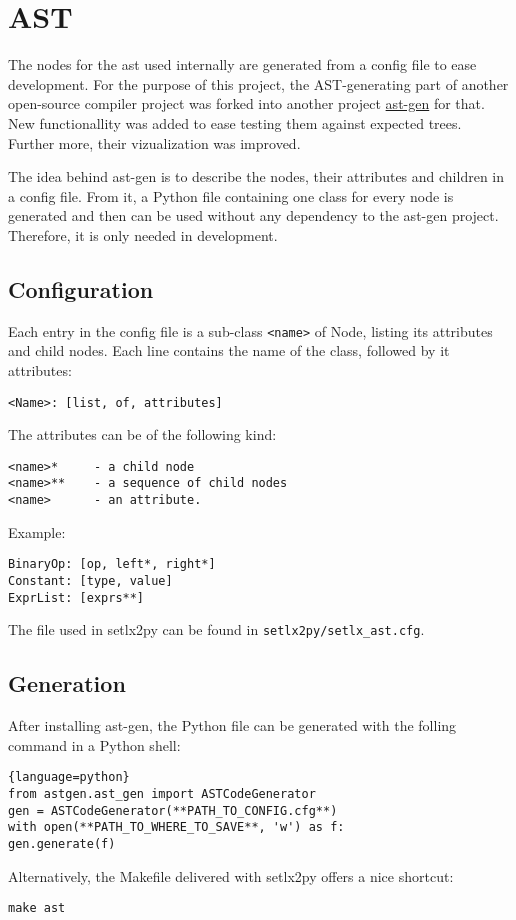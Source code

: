 
\section{AST}
\label{sec:ast}


The nodes for the \gls{ast} used  internally are generated from a config file to ease development. For the purpose of this project, the AST-generating part of another open-source compiler project  was forked into another project \url{ast-gen} for that. New functionallity was added to ease testing them against expected trees.  Further more, their vizualization was improved.

The idea behind ast-gen is to describe the nodes, their attributes and children in a config file. From it, a Python file containing one class for every node is generated and then can be used without any dependency to the ast-gen project. Therefore, it is only needed in development.

\subsection{Configuration}

Each entry in the config file is a sub-class \texttt{<name>} of Node, listing its attributes and child nodes. Each line contains the name of the class, followed by it attributes:

\verb$<Name>: [list, of, attributes]$

The attributes can be of the following kind:

\begin{verbatim}
<name>*     - a child node
<name>**    - a sequence of child nodes
<name>      - an attribute.
\end{verbatim}

Example:

\begin{verbatim}
BinaryOp: [op, left*, right*]
Constant: [type, value]
ExprList: [exprs**]
\end{verbatim}

The file used in setlx2py can be found in \texttt{setlx2py/setlx_ast.cfg}.

\subsection{Generation}

After installing ast-gen, the Python file can be generated with the folling command in a Python shell:

\begin{lstlisting}{language=python}
from astgen.ast_gen import ASTCodeGenerator
gen = ASTCodeGenerator(**PATH_TO_CONFIG.cfg**)
with open(**PATH_TO_WHERE_TO_SAVE**, 'w') as f:
gen.generate(f)
\end{lstlisting}

Alternatively, the Makefile delivered with setlx2py offers a nice shortcut:

\verb$make ast$
